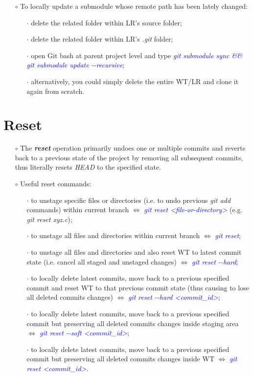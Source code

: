 \documentclass[a4paper,portrait,10pt]{article}   %
\newcommand{\mydiv}{$\Leftrightarrow$ }   %
\newcommand{\mycmd}[1]{\textcolor{blue}{\textit{#1}}}   %
\newcommand{\myvspace}{\vspace{4mm}}   %
\begin{document}
\begin{itemize}
\item[$\circ$] To locally update a submodule whose remote path has been lately changed:
\begin{itemize}
  \item[$\cdot$] delete the related folder within LR's source folder;
  \item[$\cdot$] delete the related folder within LR's \textit{.git} folder;
  \item[$\cdot$] open Git bash at parent project level and type \mycmd{git submodule sync \&\& git submodule update -{}-recursive};
  \item[$\cdot$] alternatively, you could simply delete the entire WT/LR and clone it again from scratch.
\end{itemize}
\end{itemize}
\myvspace


\section{Reset}   \label{sec:Reset}

\begin{itemize}
\item[$\circ$] The \textbf{\textit{reset}} operation primarily undoes one or multiple commits and reverts back to a previous state of the project by removing all subsequent commits, thus literally resets \textit{HEAD} to the specified state.
\myvspace

\item[$\circ$] Useful reset commands:
\begin{itemize}
  \item[$\cdot$] to unstage specific files or directories (i.e. to undo previous \textit{git add} commands) within current branch \mydiv \mycmd{git reset <file-or-directory>} (e.g. \textit{git reset xyz.c});
  \item[$\cdot$] to unstage all files and directories within current branch \mydiv \mycmd{git reset};
  \item[$\cdot$] to unstage all files and directories and also reset WT to latest commit state (i.e. cancel all staged and unstaged changes) \mydiv \mycmd{git reset -{}-hard};
  \item[$\cdot$] to locally delete latest commits, move back to a previous specified commit and reset WT to that previous commit state (thus causing to lose all deleted commits changes) \mydiv \mycmd{git reset -{}-hard <commit\_id>};
  \item[$\cdot$] to locally delete latest commits, move back to a previous specified commit but preserving all deleted commits changes inside staging area \mydiv \mycmd{git reset -{}-soft <commit\_id>};
  \item[$\cdot$] to locally delete latest commits, move back to a previous specified commit but preserving all deleted commits changes inside WT \mydiv \mycmd{git reset <commit\_id>}.
\end{itemize}
\end{itemize}
\myvspace
\end{document}
